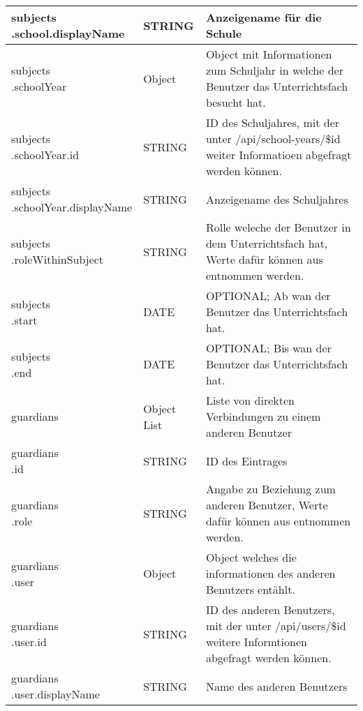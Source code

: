\begin{longtable}{|p{}|p{}|p{}|}
subjects\[\].school.displayName & STRING & Anzeigename für die Schule \\ \hline
subjects\[\].schoolYear & Object & Object mit Informationen zum Schuljahr in welche der Benutzer das Unterrichtsfach besucht hat. \\ \hline
subjects\[\].schoolYear.id & STRING & ID des Schuljahres, mit der unter /api/school-years/\$id weiter Informatioen abgefragt werden können. \\ \hline
subjects\[\].schoolYear.displayName & STRING & Anzeigename des Schuljahres \\\hline
subjects\[\].roleWithinSubject & STRING & Rolle weleche der Benutzer in dem Unterrichtsfach hat, Werte dafür können aus {tab:intro:rolessubject} entnommen werden. \\ \hline
subjects\[\].start & DATE & OPTIONAL; Ab wan der Benutzer das Unterrichtsfach hat.\\ \hline
subjects\[\].end & DATE & OPTIONAL; Bis wan der Benutzer das Unterrichtsfach hat. \\ \hline
guardians & Object List & Liste von direkten Verbindungen zu einem anderen Benutzer \\ \hline
guardians\[\].id & STRING & ID des Eintrages \\ \hline
guardians\[\].role & STRING & Angabe zu Beziehung zum anderen Benutzer, Werte dafür können aus {tab:intro:rolesuser} entnommen werden. \\ \hline
guardians\[\].user & Object & Object welches die informationen des anderen Benutzers entählt. \\ \hline
guardians\[\].user.id & STRING & ID des anderen Benutzers, mit der unter /api/users/\$id weitere Informtionen abgefragt werden können. \\ \hline
guardians\[\].user.displayName & STRING & Name des anderen Benutzers \\ \hline
\end{longtable}
